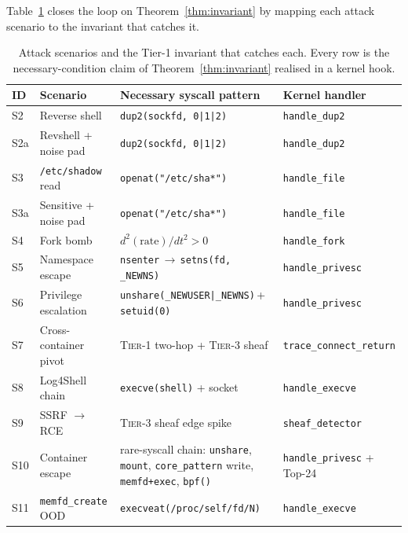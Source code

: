 Table~\ref{tab:invariants} closes the loop on Theorem~\ref{thm:invariant}
by mapping each attack scenario to the invariant that catches it.

\begin{table}[t]
\centering
\caption[Per-scenario invariants]{Attack scenarios and the Tier-1 invariant
that catches each. Every row is the necessary-condition claim of
Theorem~\ref{thm:invariant} realised in a kernel hook.}
\label{tab:invariants}
\small
\begin{tabular}{llll}
\toprule
ID & Scenario & Necessary syscall pattern & Kernel handler \\
\midrule
S2   & Reverse shell         & \texttt{dup2(sockfd, 0|1|2)}    & \texttt{handle\_dup2} \\
S2a  & Revshell + noise pad  & \texttt{dup2(sockfd, 0|1|2)}    & \texttt{handle\_dup2} \\
S3   & \texttt{/etc/shadow} read
                              & \texttt{openat("/etc/sha*")}    & \texttt{handle\_file} \\
S3a  & Sensitive + noise pad & \texttt{openat("/etc/sha*")}    & \texttt{handle\_file} \\
S4   & Fork bomb             & $d^2(\text{rate})/dt^2 > 0$     & \texttt{handle\_fork} \\
S5   & Namespace escape      & \texttt{nsenter}\,$\to$\,\texttt{setns(fd,\,\_NEWNS)}
                                                               & \texttt{handle\_privesc} \\
S6   & Privilege escalation  & \texttt{unshare(\_NEWUSER|\_NEWNS)}\,+\,\texttt{setuid(0)}
                                                               & \texttt{handle\_privesc} \\
S7   & Cross-container pivot & \textsc{Tier-1} two-hop + \textsc{Tier-3} sheaf
                                                               & \texttt{trace\_connect\_return} \\
S8   & Log4Shell chain       & \texttt{execve(shell)} + socket
                                                               & \texttt{handle\_execve} \\
S9   & SSRF $\rightarrow$ RCE
                              & \textsc{Tier-3} sheaf edge spike
                                                               & \texttt{sheaf\_detector} \\
S10  & Container escape      & rare-syscall chain: \texttt{unshare}, \texttt{mount},
                                \texttt{core\_pattern} write, \texttt{memfd+exec}, \texttt{bpf()}
                                                               & \texttt{handle\_privesc} + Top-24 \\
S11  & \texttt{memfd\_create} OOD
                              & \texttt{execveat(/proc/self/fd/N)}
                                                               & \texttt{handle\_execve} \\
\bottomrule
\end{tabular}
\end{table}

